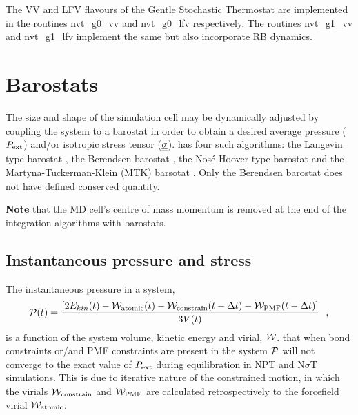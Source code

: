 The VV and LFV flavours of the Gentle Stochastic Thermostat are implemented in
the \D routines {\sc nvt\_g0\_vv} and {\sc nvt\_g0\_lfv} respectively.
The routines {\sc nvt\_g1\_vv} and {\sc nvt\_g1\_lfv} implement the
same but also incorporate RB dynamics.

\section{Barostats}

The size and shape of the simulation cell may be dynamically
adjusted by coupling the system to a barostat in order to obtain a
desired average pressure ($P_{\rm ext}$) and/or isotropic stress
tensor ($\mbox{$\underline{\underline{\bf \sigma}}$}$).  \D has four such
algorithms: the Langevin type barostat \cite{quigley-04a},
the Berendsen barostat \cite{berendsen-84a}, the
Nos\'{e}-Hoover type barostat \cite{hoover-85a} and the
Martyna-Tuckerman-Klein (MTK) barsotat \cite{martyna-96a}.  Only
the Berendsen barostat does not have defined conserved quantity.

{\bf Note} that the MD cell's centre of mass momentum is removed
at the end of the integration algorithms with barostats.

\subsection{Instantaneous pressure and stress}

The instantaneous pressure in a system,
\begin{equation}
{\cal P}(t) = \frac{\left[ 2 E_{kin}(t) - {\cal W}_{\rm atomic}(t) -
{\cal W}_{\rm constrain}(t - \Delta t) -
{\cal W}_{\rm PMF}(t - \Delta t) \right]} {3 V(t)}~~, \label{prs_inst}
\end{equation}
is a function of the system volume, kinetic energy and virial, ${\cal W}$.
 that when bond constraints or/and PMF constraints
are present in the system ${\cal P}$ will not converge to the exact
value of $P_{\rm ext}$ during equilibration in NPT and N$\sigma$T
simulations.  This is due to iterative nature of the constrained
motion, in which the virials ${\cal W}_{\rm constrain}$ and ${\cal W}_{\rm PMF}$
are calculated retrospectively to the forcefield virial ${\cal W}_{\rm atomic}$.

